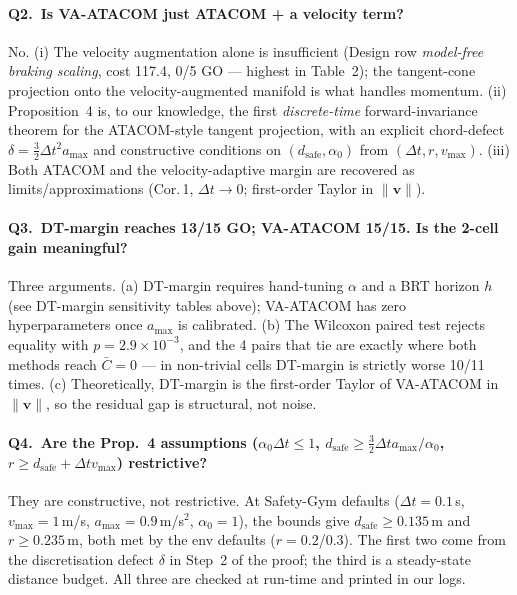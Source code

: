 \documentclass[letterpaper]{article}
\begin{document}
\paragraph{Q2.\ Is VA-ATACOM just ATACOM + a velocity term?}
No. (i) The velocity augmentation alone is insufficient (Design row \emph{model-free braking scaling}, cost 117.4, 0/5 GO --- highest in Table~2); the tangent-cone projection onto the velocity-augmented manifold is what handles momentum. (ii) Proposition~4 is, to our knowledge, the first \emph{discrete-time} forward-invariance theorem for the ATACOM-style tangent projection, with an explicit chord-defect $\delta{=}\tfrac{3}{2}\Delta t^2 a_{\max}$ and constructive conditions on $(d_\text{safe}, \alpha_0)$ from $(\Delta t, r, v_{\max})$. (iii) Both ATACOM and the velocity-adaptive margin are recovered as limits/approximations (Cor.\,1, $\Delta t{\to}0$; first-order Taylor in $\|\boldsymbol v\|$).

\paragraph{Q3.\ DT-margin reaches 13/15 GO; VA-ATACOM 15/15. Is the 2-cell gain meaningful?}
Three arguments. (a) DT-margin requires hand-tuning $\alpha$ and a BRT horizon $h$ (see DT-margin sensitivity tables above); VA-ATACOM has zero hyperparameters once $a_{\max}$ is calibrated. (b) The Wilcoxon paired test rejects equality with $p{=}2.9{\times}10^{-3}$, and the 4 pairs that tie are exactly where both methods reach $\bar C{=}0$ --- in non-trivial cells DT-margin is strictly worse 10/11 times. (c) Theoretically, DT-margin is the first-order Taylor of VA-ATACOM in $\|\boldsymbol v\|$, so the residual gap is structural, not noise.

\paragraph{Q4.\ Are the Prop.~4 assumptions ($\alpha_0\Delta t{\le}1$, $d_\text{safe}{\ge}\tfrac{3}{2}\Delta t a_{\max}/\alpha_0$, $r{\ge}d_\text{safe}{+}\Delta t v_{\max}$) restrictive?}
They are constructive, not restrictive. At Safety-Gym defaults ($\Delta t{=}0.1$\,s, $v_{\max}{=}1$\,m/s, $a_{\max}{=}0.9$\,m/s$^2$, $\alpha_0{=}1$), the bounds give $d_\text{safe}{\ge}0.135$\,m and $r{\ge}0.235$\,m, both met by the env defaults ($r{=}0.2$/$0.3$). The first two come from the discretisation defect $\delta$ in Step~2 of the proof; the third is a steady-state distance budget. All three are checked at run-time and printed in our logs.
\end{document}
